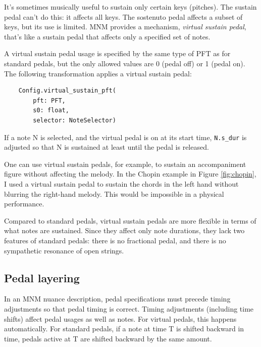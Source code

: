 \documentclass[letterpaper, 12pt]{article}
\begin{document}
It's sometimes musically useful to sustain only certain keys (pitches).
The sustain pedal can't do this: it affects all keys.
The sostenuto pedal affects a subset of keys, but its use is limited.
MNM provides a mechanism, \textit{virtual sustain pedal},
that's like a sustain pedal that affects only a specified set of notes.

A virtual sustain pedal usage
is specified by the same type of PFT as for standard pedals,
but the only allowed values are 0 (pedal off) or 1 (pedal on).
The following transformation applies a virtual sustain pedal:
\begin{small}\begin{singlespace}\vspace{-18px}\begin{verbatim}
    Config.virtual_sustain_pft(
        pft: PFT,
        s0: float,
        selector: NoteSelector)
\end{verbatim}\end{singlespace}\end{small}\vspace{-18px}\noindent
If a note N is selected, and the virtual pedal is on at its start time,
\texttt{N.s\_dur} is adjusted so that N is sustained at least until the
pedal is released.

One can use virtual sustain pedals, for example,
to sustain an accompaniment figure without affecting the melody.
In the Chopin example in Figure \ref{fig:chopin},
I used a virtual sustain pedal to sustain the chords in the left hand
without blurring the right-hand melody.
This would be impossible in a physical performance.

Compared to standard pedals,
virtual sustain pedals are more flexible
in terms of what notes are sustained.
Since they affect only note durations,
they lack two features of standard pedals: there is no fractional pedal,
and there is no sympathetic resonance of open strings.

\subsection{Pedal layering}

In an MNM nuance description,
pedal specifications must precede timing adjustments
so that pedal timing is correct.
Timing adjustments (including time shifts)
affect pedal usages as well as notes.
For virtual pedals, this happens automatically.
For standard pedals, if a note at time T is shifted backward in time,
pedals active at T are shifted backward by the same amount.
\end{document}

